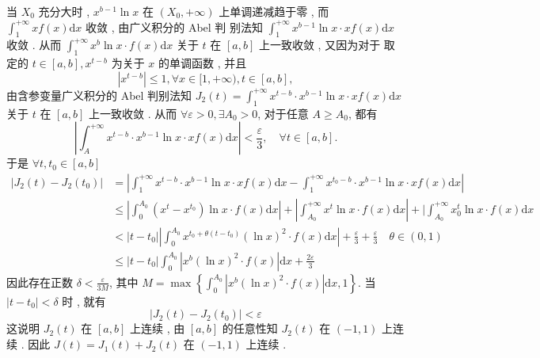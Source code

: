 \documentclass[10pt]{article}
\begin{document}
 当  $X_{0}$  充分大时 , $x^{b-1} \ln x$  在  $\left(X_{0},+\infty\right)$  上单调递减趋于零 ,  而  $\int_{1}^{+\infty} x f(x) \mathrm{d} x$  收敛 ,  由广义积分的  Abel  判   别法知  $\int_{1}^{+\infty} x^{b-1} \ln x \cdot x f(x) \mathrm{d} x$  收敛 .  从而  $\int_{1}^{+\infty} x^{b} \ln x \cdot f(x) \mathrm{d} x$  关于  $t$  在  $[a, b]$  上一致收敛 ,  又因为对于   取定的  $t \in[a, b], x^{t-b}$  为关于  $x$  的单调函数 ,  并且 
$$
\left|x^{t-b}\right| \leqslant 1, \forall x \in[1,+\infty), t \in[a, b],
$$
 由含参变量广义积分的  Abel  判别法知  $J_{2}(t)=\int_{1}^{+\infty} x^{t-b} \cdot x^{b-1} \ln x \cdot x f(x) \mathrm{d} x$  关于  $t$  在  $[a, b]$  上一致收敛 .  从而  $\forall \varepsilon>0, \exists A_{0}>0$,  对于任意  $A \geqslant A_{0}$,  都有 
$$
\left|\int_{A}^{+\infty} x^{t-b} \cdot x^{b-1} \ln x \cdot x f(x) \mathrm{d} x\right|<\frac{\varepsilon}{3}, \quad \forall t \in[a, b] .
$$
 于是  $\forall t, t_{0} \in[a, b]$
$$
\begin{aligned}
\left|J_{2}(t)-J_{2}\left(t_{0}\right)\right| &=\left|\int_{1}^{+\infty} x^{t-b} \cdot x^{b-1} \ln x \cdot x f(x) \mathrm{d} x-\int_{1}^{+\infty} x^{t_{0}-b} \cdot x^{b-1} \ln x \cdot x f(x) \mathrm{d} x\right| \\
& \leqslant\left|\int_{0}^{A_{0}}\left(x^{t}-x^{t_{0}}\right) \ln x \cdot f(x) \mathrm{d} x\right|+\left|\int_{A_{0}}^{+\infty} x^{t} \ln x \cdot f(x) \mathrm{d} x\right|+\mid \int_{A_{0}}^{+\infty} x_{0}^{t} \ln x \cdot f(x) \mathrm{d} x \\
&<\left|t-t_{0}\right|\left|\int_{0}^{A_{0}} x^{t_{0}+\theta\left(t-t_{0}\right)}(\ln x)^{2} \cdot f(x) \mathrm{d} x\right|+\frac{\varepsilon}{3}+\frac{\varepsilon}{3} \quad \theta \in(0,1) \\
& \leqslant\left|t-t_{0}\right| \int_{0}^{A_{0}}\left|x^{b}(\ln x)^{2} \cdot f(x)\right| \mathrm{d} x+\frac{2 \varepsilon}{3}
\end{aligned}
$$
 因此存在正数  $\delta<\frac{\varepsilon}{3 M}$,  其中  $M=\max \left\{\int_{0}^{A_{0}}\left|x^{b}(\ln x)^{2} \cdot f(x)\right| \mathrm{d} x, 1\right\}$.  当  $\left|t-t_{0}\right|<\delta$  时 ,  就有 
$$
\left|J_{2}(t)-J_{2}\left(t_{0}\right)\right|<\varepsilon
$$
 这说明  $J_{2}(t)$  在  $[a, b]$  上连续 ,  由  $[a, b]$  的任意性知  $J_{2}(t)$  在  $(-1,1)$  上连续 .  因此  $J(t)=J_{1}(t)+J_{2}(t)$  在  $(-1,1)$  上连续 .
\end{document}

